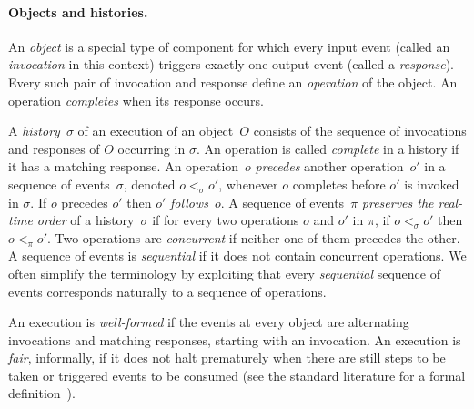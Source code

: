 \documentclass[oribibl]{llncs}
\theoremstyle{definition-boldhead}
\begin{document}
\paragraph{Objects and histories.}
An \emph{object} is a special type of component for which every input
event (called an \emph{invocation} in this context) triggers exactly
one output event (called a \emph{response}).  Every such pair of
invocation and response define an \emph{operation} of the object.  An
operation \emph{completes} when its response occurs.

A \emph{history}~$\sigma$ of an execution of an object~$O$ consists of
the sequence of invocations and responses of $O$ occurring in
$\sigma$.  An operation is called \emph{complete} in a history if it
has a matching response.
An operation~$o$ \emph{precedes} another operation~$o'$ in a sequence
of events~$\sigma$, denoted $o <_\sigma o'$, whenever $o$ completes
before $o'$ is invoked in $\sigma$. If $o$ precedes $o'$ then $o'$
\emph{follows}~$o$.  A sequence of events~$\pi$ \emph{preserves the
  real-time order} of a history~$\sigma$ if for every two operations
$o$ and $o'$ in $\pi$, if $o <_\sigma o'$ then $o<_\pi o'$.  Two
operations are \emph{concurrent} if neither one of them precedes the
other.  A sequence of events is \emph{sequential} if it does not
contain concurrent operations.
We often simplify the terminology by exploiting that every
\emph{sequential} sequence of events corresponds naturally to a
sequence of operations.


An execution is \emph{well-formed} if the events at every object are
alternating invocations and matching responses, starting with an
invocation.  An execution is \emph{fair}, informally, if it does not
halt prematurely when there are still steps to be taken or triggered
events to be consumed (see the standard literature for a formal
definition~\cite{Lynch96}).
\end{document}
